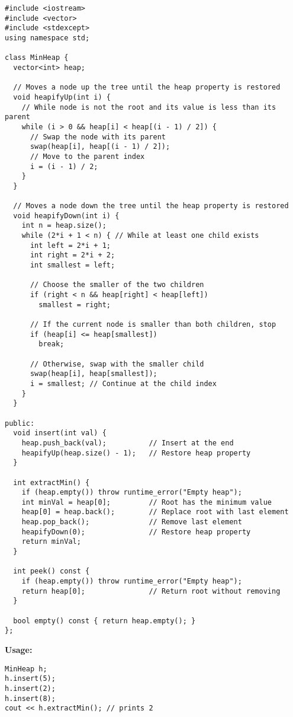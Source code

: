 \documentclass{article}
\begin{document}
\begin{lstlisting}[style=cppstyle]
#include <iostream>
#include <vector>
#include <stdexcept>
using namespace std;

class MinHeap {
  vector<int> heap;

  // Moves a node up the tree until the heap property is restored
  void heapifyUp(int i) {
    // While node is not the root and its value is less than its parent
    while (i > 0 && heap[i] < heap[(i - 1) / 2]) {
      // Swap the node with its parent
      swap(heap[i], heap[(i - 1) / 2]);
      // Move to the parent index
      i = (i - 1) / 2;
    }
  }

  // Moves a node down the tree until the heap property is restored
  void heapifyDown(int i) {
    int n = heap.size();
    while (2*i + 1 < n) { // While at least one child exists
      int left = 2*i + 1;
      int right = 2*i + 2;
      int smallest = left;

      // Choose the smaller of the two children
      if (right < n && heap[right] < heap[left])
        smallest = right;

      // If the current node is smaller than both children, stop
      if (heap[i] <= heap[smallest])
        break;

      // Otherwise, swap with the smaller child
      swap(heap[i], heap[smallest]);
      i = smallest; // Continue at the child index
    }
  }

public:
  void insert(int val) {
    heap.push_back(val);          // Insert at the end
    heapifyUp(heap.size() - 1);   // Restore heap property
  }

  int extractMin() {
    if (heap.empty()) throw runtime_error("Empty heap");
    int minVal = heap[0];         // Root has the minimum value
    heap[0] = heap.back();        // Replace root with last element
    heap.pop_back();              // Remove last element
    heapifyDown(0);               // Restore heap property
    return minVal;
  }

  int peek() const {
    if (heap.empty()) throw runtime_error("Empty heap");
    return heap[0];               // Return root without removing
  }

  bool empty() const { return heap.empty(); }
};
\end{lstlisting}

\textbf{Usage:}
\begin{lstlisting}[style=cppstyle]
MinHeap h;
h.insert(5);
h.insert(2);
h.insert(8);
cout << h.extractMin(); // prints 2
\end{lstlisting}
\end{document}
